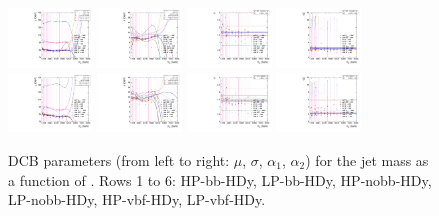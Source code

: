 \begin{figure}[htbp]
  \includegraphics[width=0.2\textwidth]{fig/2Dfit/paramSignalShape_allSig_MJJ_HP_vbf_HDy_mean.pdf}
  \includegraphics[width=0.2\textwidth]{fig/2Dfit/paramSignalShape_allSig_MJJ_HP_vbf_HDy_sigma.pdf}
  \includegraphics[width=0.2\textwidth]{fig/2Dfit/paramSignalShape_allSig_MJJ_HP_vbf_HDy_alpha.pdf}
  \includegraphics[width=0.2\textwidth]{fig/2Dfit/paramSignalShape_allSig_MJJ_HP_vbf_HDy_alpha2.pdf}\\
  \includegraphics[width=0.2\textwidth]{fig/2Dfit/paramSignalShape_allSig_MJJ_LP_vbf_HDy_mean.pdf}
  \includegraphics[width=0.2\textwidth]{fig/2Dfit/paramSignalShape_allSig_MJJ_LP_vbf_HDy_sigma.pdf}
  \includegraphics[width=0.2\textwidth]{fig/2Dfit/paramSignalShape_allSig_MJJ_LP_vbf_HDy_alpha.pdf}
  \includegraphics[width=0.2\textwidth]{fig/2Dfit/paramSignalShape_allSig_MJJ_LP_vbf_HDy_alpha2.pdf}\\
  \caption{
    DCB parameters (from left to right: $\mu$, $\sigma$, $\alpha_1$, $\alpha_2$) for the jet mass \MJ as a function of \MX.
    Rows 1 to 6: HP-bb-HDy, LP-bb-HDy, HP-nobb-HDy, LP-nobb-HDy, HP-vbf-HDy, LP-vbf-HDy.
  }
  \label{fig:MJJShapeParam_HDy_Run2}
\end{figure}

